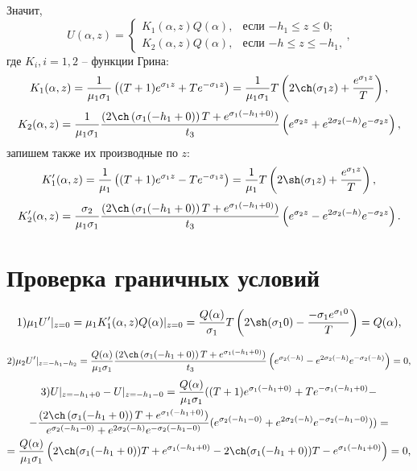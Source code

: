 \documentclass[a4paper, 12pt]{article}
\newcommand{\s}[1]{\sigma_{#1}}
\newcommand{\m}[1]{\mu_{#1}}
\newcommand{\E}[2]{e^{#1 #2}}
\begin{document}
Значит,
    \[
U(\alpha,z) =
\begin{cases}
K_1(\alpha,z)Q(\alpha), & \text{если $-h_1\leq z \leq0$;} \\
K_2(\alpha,z)Q(\alpha), & \text{если $-h\leq z \leq-h_1$,}
\end{cases},
\]
где $K_i, i=1, 2$ -- функции Грина:
$$K_1(\alpha,z)=\frac{1}{\m{1}\s{1}}\left((T+1)\E{\s{1}}{z}+T\E{-\s{1}}{z} \right)=\frac{1}{\m{1}\s{1}}T \left(2 \ch (\s{1}z) +\frac{\E{\s{1}}{z}}{T}\right),$$
$$K_2(\alpha,z)=\frac{1}{\m{1} \s{1}}\frac{(2\ch \left(\s{1}(-h_1+0) \right)T+\E{\s{1}}{(-h_1+0)})}{t_3}\left(\E{\s{2}}{z}+ \E{2\s{2}}{(-h)} \E{-\s{2}}{z} \right),$$
запишем также их производные по $z$:
$$K_1'(\alpha,z)=\frac{1}{\m{1}}\left((T+1)\E{\s{1}}{z}-T\E{-\s{1}}{z} \right)=\frac{1}{\m{1}}T \left(2 \sh (\s{1}z) +\frac{\E{\s{1}}{z}}{T}\right),$$
$$K_2'(\alpha,z)=\frac{\s{2}}{\m{1} \s{1}}\frac{(2\ch \left(\s{1}(-h_1+0) \right)T+\E{\s{1}}{(-h_1+0)})}{t_3}\left(\E{\s{2}}{z}- \E{2\s{2}}{(-h)} \E{-\s{2}}{z} \right).$$

\section{Проверка граничных условий}

$$1) \m{1}U'|_{z=0}=\m{1}K_1'(\alpha,z)Q(\alpha)|_{z=0}=\frac{Q(\alpha)}{\s{1}}T \left(2 \sh (\s{1}0) -\frac{-\s{1}\E{\s{1}}{0}}{T}\right)=Q(\alpha),$$

$$2)\m{2}U'|_{z=-h_1-h_2}=\frac{Q(\alpha)}{\m{1} \s{1}}\frac{(2\ch \left(\s{1}(-h_1+0) \right)T+\E{\s{1}}{(-h_1+0)})}{t_3}\left(\E{\s{2}}{(-h)}- \E{2\s{2}}{(-h)} \E{-\s{2}}{(-h)} \right)=0,$$
\begin{multline}
    3)U|_{z=-h_1+0}-U|_{z=-h_1-0}=\frac{Q(\alpha)}{\m{1} \s{1}} ((T+1)\E{\s{1}}{(-h_1+0)}+T\E{-\s{1}}{(-h_1+0)}-\\
    -\frac{(2\ch \left (\s{1}(-h_1+0) \right)T+\E{\s{1}}{(-h_1+0)})}{\E{\s{2}}{(-h_1-0)}+ \E{2\s{2}}{(-h)} \E{-\s{2}}{(-h_1-0)}}(\E{\s{2}}{(-h_1-0)}+ \E{2\s{2}}{(-h)} \E{-\s{2}}{(-h_1-0)}) )=\\
    =\frac{Q(\alpha)}{\m{1} \s{1}} \left(2 \ch (\s{1}(-h_1+0))T +\E{\s{1}}{(-h_1+0)} - 2 \ch (\s{1}(-h_1+0))T-\E{\s{1}}{(-h_1+0)}\right)=0,
\end{multline}
\end{document}
